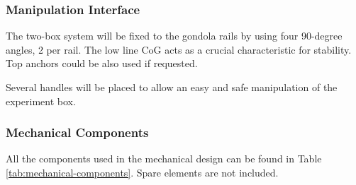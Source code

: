 \pagebreak
\subsubsection{Manipulation Interface}

The two-box system will be fixed to the gondola rails by using four 90-degree angles, 2 per rail. The low line CoG acts as a crucial characteristic for stability. Top anchors could be also used if requested. 


Several handles will be placed to allow an easy and safe manipulation of the experiment box. 


\subsubsection{Mechanical Components}

All the components used in the mechanical design can be found in Table \ref{tab:mechanical-components}. Spare elements are not included. 


\raggedbottom